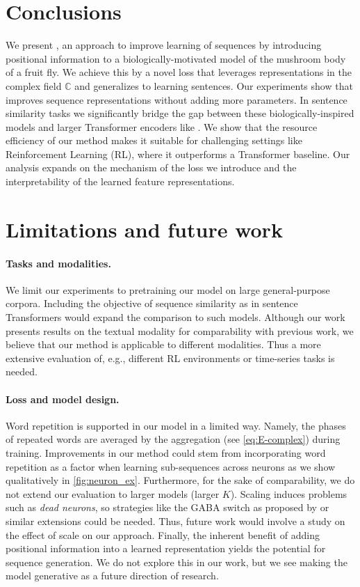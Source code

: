 \section{Conclusions}\label{sec:conclusion}
We present \methodname, an approach to improve learning of sequences by introducing positional information to a biologically-motivated model of the mushroom body of a fruit fly.
We achieve this by a novel loss that leverages representations in the complex field $\mathbb{C}$ and generalizes \flyvec \cite{flyvec} to learning sentences.
Our experiments show that \methodname improves sequence representations without adding more parameters.
In sentence similarity tasks we significantly bridge the gap between these biologically-inspired models and larger Transformer encoders like \bert. 
We show that the resource efficiency of our method makes it suitable for challenging settings like Reinforcement Learning (RL), where it outperforms a Transformer baseline.
Our analysis expands on the mechanism of the loss we introduce and the interpretability of the learned feature representations.

\section{Limitations and future work}\label{sec:future}
\paragraph{Tasks and modalities.}
We limit our experiments to pretraining our model on large general-purpose corpora.
Including the objective of sequence similarity as in sentence Transformers \cite{s_bert} would expand the comparison to such models.
Although our work presents results on the textual modality for comparability with previous work, we believe that our method is applicable to different modalities.
Thus a more extensive evaluation of, e.g., different RL environments or time-series tasks is needed.

\paragraph{Loss and model design.}
Word repetition is supported in our model in a limited way.
Namely, the phases of repeated words are averaged by the aggregation (see \cref{eq:E-complex}) during training.
Improvements in our method could stem from incorporating word repetition as a factor when learning sub-sequences across neurons as we show qualitatively in \cref{fig:neuron_ex}.
Furthermore, for the sake of comparability, we do not extend our evaluation to larger models (larger $K$). 
Scaling induces problems such as \textit{dead neurons}, so strategies like the GABA switch as proposed by \cite{sdm} or similar extensions could be needed.
Thus, future work would involve a study on the effect of scale on our approach.
Finally, the inherent benefit of adding positional information into a learned representation yields the potential for sequence generation.
We do not explore this in our work, but we see making the model generative as a future direction of research.
